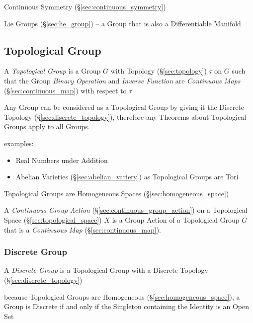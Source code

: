 Continuous Symmetry (\S\ref{sec:continuous_symmetry})

Lie Groups (\S\ref{sec:lie_group}) -- a Group that is also a
Differentiable Manifold



\subsection{Topological Group}\label{sec:topological_group}

A \emph{Topological Group} is a Group $G$ with Topology (\S\ref{sec:topology})
$\tau$ on $G$ such that the Group \emph{Binary Operation} and \emph{Inverse
  Function} are \emph{Continuous Maps} (\S\ref{sec:continuous_map})
with respect to $\tau$

Any Group can be considered as a Topological Group by giving it the Discrete
Topology (\S\ref{sec:discrete_topology}), therefore any Theorems about
Topological Groups apply to all Groups.

examples:
\begin{itemize}
  \item Real Numbers under Addition
  \item Abelian Varieties (\S\ref{sec:abelian_variety}) as Topological Groups
    are Tori %
\end{itemize}

Topological Groups are Homogeneous Spaces (\S\ref{sec:homogeneous_space})

A \emph{Continuous Group Action} (\S\ref{sec:continuous_group_action}) on a
Topological Space (\S\ref{sec:topological_space}) $X$ is a Group Action of a
Topological Group $G$ that is a \emph{Continuous Map}
(\S\ref{sec:continuous_map}).



\subsubsection{Discrete Group}\label{sec:discrete_group}

A \emph{Discrete Group} is a Topological Group with a Discrete Topology
(\S\ref{sec:discrete_topology})

because Topological Groups are Homogeneous (\S\ref{sec:homogeneous_space}), a
Group is Discrete if and only if the Singleton containing the Identity is an
Open Set

